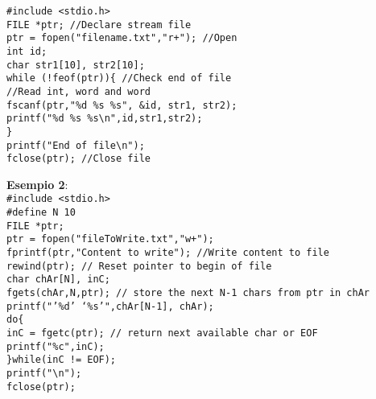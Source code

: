 \begin{flushleft}
\begin{itemize}
\begin{flushleft}
            \texttt{\#include <stdio.h>\\
            FILE *ptr; //Declare stream file\\
            ptr = fopen("filename.txt","r+"); //Open\\
            int id;\\
            char str1[10], str2[10];\\
            while (!feof(ptr))\{ //Check end of file\\
            \tab //Read int, word and word \\
            \tab fscanf(ptr,"\%d \%s \%s", \&id, str1, str2);\\
            \tab printf("\%d \%s \%s\textbackslash n",id,str1,str2); \\
            \}\\
            printf("End of file\textbackslash n");\\
            fclose(ptr); //Close file\\
            }\par 
            \textbf{Esempio 2}:\\
            \texttt{\#include <stdio.h>\\
              \#define N 10\\
              FILE *ptr;\\
              ptr = fopen("fileToWrite.txt","w+"); \\
              fprintf(ptr,"Content to write"); //Write content to file\\
              rewind(ptr); // Reset pointer to begin of file\\
              char chAr[N], inC;\\
              fgets(chAr,N,ptr); // store the next N-1 chars from ptr in chAr\\
              printf("’\%d’ ‘\%s’",chAr[N-1], chAr);\\
              do\{\\
              \tab inC = fgetc(ptr); // return next available char or EOF\\
              \tab printf("\%c",inC);\\
              \}while(inC != EOF); \\
              printf("\textbackslash n");\\
              fclose(ptr);\\
            }
          \end{flushleft}

\end{itemize}
\end{flushleft}

